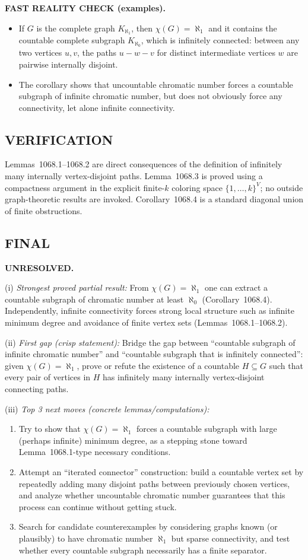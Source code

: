 \textbf{FAST REALITY CHECK (examples).}
\begin{itemize}
\item If $G$ is the complete graph $K_{\aleph_1}$, then $\chi(G)=\aleph_1$ and it contains the countable complete subgraph $K_{\aleph_0}$, which is infinitely connected: between any two vertices $u,v$, the paths $u-w-v$ for distinct intermediate vertices $w$ are pairwise internally disjoint.
\item The corollary shows that uncountable chromatic number forces a countable subgraph of infinite chromatic number, but does not obviously force any connectivity, let alone infinite connectivity.
\end{itemize}

\subsection*{VERIFICATION}
Lemmas~1068.1--1068.2 are direct consequences of the definition of infinitely many internally vertex-disjoint paths.
Lemma~1068.3 is proved using a compactness argument in the explicit finite-$k$ coloring space $\{1,\dots,k\}^V$; no outside graph-theoretic results are invoked.
Corollary~1068.4 is a standard diagonal union of finite obstructions.

\subsection*{FINAL}
\textbf{UNRESOLVED.}

(i) \emph{Strongest proved partial result:}
From $\chi(G)=\aleph_1$ one can extract a countable subgraph of chromatic number at least $\aleph_0$ (Corollary~1068.4).  Independently, infinite connectivity forces strong local structure such as infinite minimum degree and avoidance of finite vertex sets (Lemmas~1068.1--1068.2).

(ii) \emph{First gap (crisp statement):}
Bridge the gap between ``countable subgraph of infinite chromatic number'' and ``countable subgraph that is infinitely connected'': given $\chi(G)=\aleph_1$, prove or refute the existence of a countable $H\subseteq G$ such that every pair of vertices in $H$ has infinitely many internally vertex-disjoint connecting paths.

(iii) \emph{Top 3 next moves (concrete lemmas/computations):}
\begin{enumerate}
\item Try to show that $\chi(G)=\aleph_1$ forces a countable subgraph with large (perhaps infinite) minimum degree, as a stepping stone toward Lemma~1068.1-type necessary conditions.
\item Attempt an ``iterated connector'' construction: build a countable vertex set by repeatedly adding many disjoint paths between previously chosen vertices, and analyze whether uncountable chromatic number guarantees that this process can continue without getting stuck.
\item Search for candidate counterexamples by considering graphs known (or plausibly) to have chromatic number $\aleph_1$ but sparse connectivity, and test whether every countable subgraph necessarily has a finite separator.
\end{enumerate}

